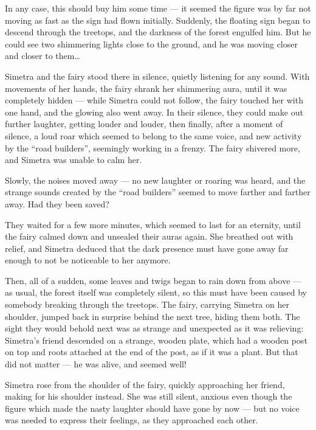In any case, this should buy him some time --- it seemed the figure was by far not moving as fast as the sign had flown initially. Suddenly, the floating sign began to descend through the treetops, and the darkness of the forest engulfed him. But he could see two shimmering lights close to the ground, and he was moving closer and closer to them\dots{}

\fancybreaker{}

Simetra and the fairy stood there in silence, quietly listening for any sound. With movements of her hands, the fairy shrank her shimmering aura, until it was completely hidden --- while Simetra could not follow, the fairy touched her with one hand, and the glowing also went away. In their silence, they could make out further laughter, getting louder and louder, then finally, after a moment of silence, a loud roar which seemed to belong to the same voice, and new activity by the \enquote{road builders}, seemingly working in a frenzy. The fairy shivered more, and Simetra was unable to calm her.

Slowly, the noises moved away --- no new laughter or roaring was heard, and the strange sounds created by the \enquote{road builders} seemed to move farther and farther away. Had they been saved?

They waited for a few more minutes, which seemed to last for an eternity, until the fairy calmed down and unsealed their auras again. She breathed out with relief, and Simetra deduced that the dark presence must have gone away far enough to not be noticeable to her anymore.

Then, all of a sudden, some leaves and twigs began to rain down from above --- as usual, the forest itself was completely silent, so this must have been caused by somebody breaking through the treetops. The fairy, carrying Simetra on her shoulder, jumped back in surprise behind the next tree, hiding them both. The sight they would behold next was as strange and unexpected as it was relieving: Simetra's friend descended on a strange, wooden plate, which had a wooden post on top and roots attached at the end of the post, as if it was a plant. But that did not matter --- he was alive, and seemed well!

Simetra rose from the shoulder of the fairy, quickly approaching her friend, making for his shoulder instead. She was still silent, anxious even though the figure which made the nasty laughter should have gone by now --- but no voice was needed to express their feelings, as they approached each other.

